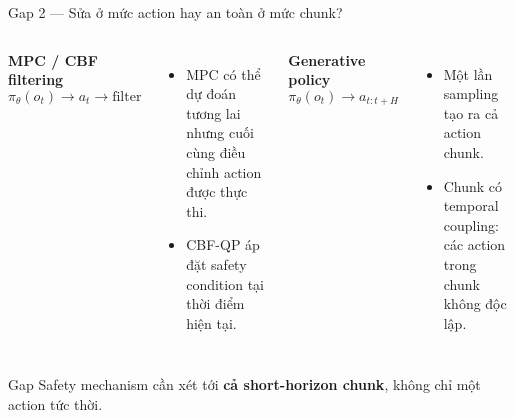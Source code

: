 \documentclass[aspectratio=169]{beamer}
\begin{document}
\begin{frame}[t,shrink=8]{Gap 2 --- Sửa ở mức action hay an toàn ở mức chunk?}
\begin{columns}[T]

\textbf{MPC / CBF filtering}
\[
\pi_\theta(o_t)
\rightarrow
\boxed{a_t}
\rightarrow
\text{filter}
\]
\begin{itemize}
    \item MPC có thể dự đoán tương lai nhưng cuối cùng điều chỉnh
    action được thực thi.
    
    \item CBF-QP áp đặt safety condition tại thời điểm hiện tại.
\end{itemize}

\textbf{Generative policy}
\[
\pi_\theta(o_t)
\rightarrow
\boxed{
a_{t:t+H}
}
\]
\begin{itemize}
    \item Một lần sampling tạo ra cả action chunk.
    \item Chunk có temporal coupling: các action trong chunk không độc lập.
\end{itemize}

\end{columns}
\vspace{6pt}

\begin{alertblock}{Gap}
Safety mechanism cần xét tới \textbf{cả short-horizon chunk},
không chỉ một action tức thời.
\end{alertblock}
\end{frame}

\end{document}
